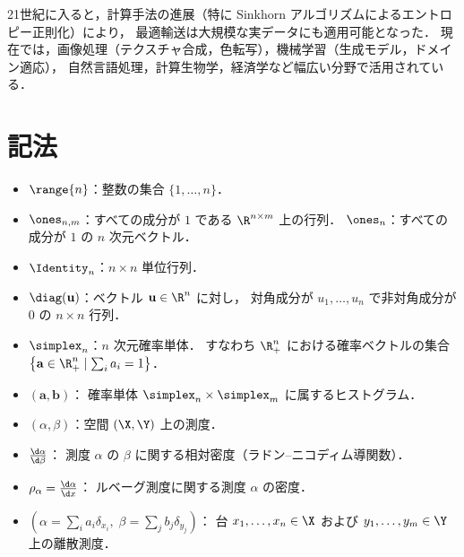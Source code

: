 21世紀に入ると，計算手法の進展（特に Sinkhorn アルゴリズムによるエントロピー正則化）により，
最適輸送は大規模な実データにも適用可能となった．
現在では，画像処理（テクスチャ合成，色転写），機械学習（生成モデル，ドメイン適応），
自然言語処理，計算生物学，経済学など幅広い分野で活用されている．

\section*{記法}
\label{sec:notation}

\begin{itemize}
  \item $\range{n}$：整数の集合 $\{1, \ldots, n\}$．

  \item $\ones_{n,m}$：すべての成分が $1$ である $\R^{n \times m}$ 上の行列．
    $\ones_n$：すべての成分が $1$ の $n$ 次元ベクトル．

  \item $\Identity_n$：$n \times n$ 単位行列．

  \item $\diag(\mathbf{u})$：ベクトル $\mathbf{u} \in \R^n$ に対し，
    対角成分が $u_1, \ldots, u_n$ で非対角成分が $0$ の $n \times n$ 行列．

  \item $\simplex_n$：$n$ 次元確率単体．
    すなわち $\R_+^n$ における確率ベクトルの集合
    $\left\{ \mathbf{a} \in \R_+^n \mid \sum_i a_i = 1 \right\}$．

  \item $(\mathbf{a}, \mathbf{b})$：
    確率単体 $\simplex_n \times \simplex_m$ に属するヒストグラム．

  \item $(\alpha, \beta)$：空間 $(\X, \Y)$ 上の測度．

  \item $\frac{\d\alpha}{\d\beta}$：
    測度 $\alpha$ の $\beta$ に関する相対密度（ラドン--ニコディム導関数）．

  \item $\rho_\alpha = \frac{\d\alpha}{\d x}$：
    ルベーグ測度に関する測度 $\alpha$ の密度．

  \item $\left(\alpha = \sum_i a_i \delta_{x_i},\;
    \beta = \sum_j b_j \delta_{y_j}\right)$：
    台 $x_1, \ldots, x_n \in \X$ および $y_1, \ldots, y_m \in \Y$ 上の離散測度．


\end{itemize}

